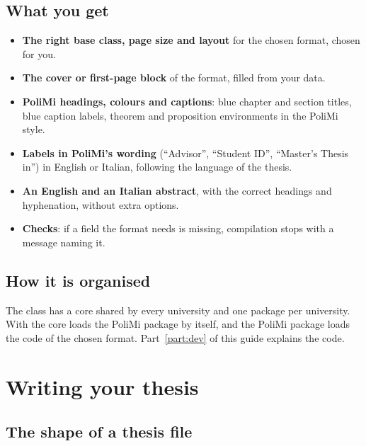 \documentclass[11pt,a4paper,oneside]{report}
\begin{document}
\section{What you get}

\begin{itemize}
  \item \textbf{The right base class, page size and layout} for the
    chosen format, chosen for you.
  \item \textbf{The cover or first-page block} of the format, filled from
    your data.
  \item \textbf{PoliMi headings, colours and captions}: blue chapter and
    section titles, blue caption labels, theorem and proposition
    environments in the PoliMi style.
  \item \textbf{Labels in PoliMi's wording} (``Advisor'', ``Student ID'',
    ``Master's Thesis in'') in English or Italian, following the language
    of the thesis.
  \item \textbf{An English and an Italian abstract}, with the correct
    headings and hyphenation, without extra options.
  \item \textbf{Checks}: if a field the format needs is missing,
    compilation stops with a message naming it.
\end{itemize}

\section{How it is organised}

The class has a core shared by every university and one package per
university. With  the core loads the PoliMi package
by itself, and the PoliMi package loads the code of the chosen format.
Part~\ref{part:dev} of this guide explains the code.



\chapter{Writing your thesis}
\label{ch:writing}

\section{The shape of a thesis file}
\end{document}
